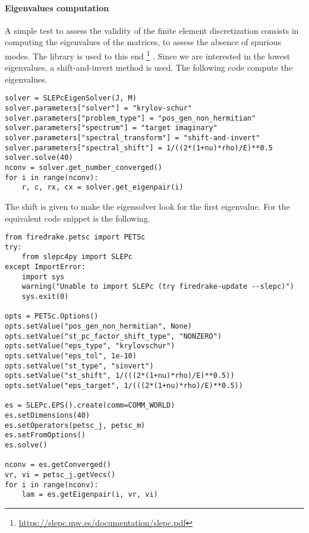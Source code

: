 \paragraph{Eigenvalues computation}
A simple test to assess the validity of the finite element discretization consists in computing the eigenvalues of the matrices, to assess the absence of spurious modes. The {} library is used to this end \footnote{\url{https://slepc.upv.es/documentation/slepc.pdf}} \cite{hernandez2005slepc}. Since we are interested in the lowest eigenvalues, a shift-and-invert method is used. The following code compute the eigenvalues.
\begin{tcolorbox}[title = Eigenvalues computation in  \fenics, coltitle=black, breakable, size=fbox, boxrule=1pt, pad at break*=1mm, colframe=red, enlarge top by=0.25em, enlarge bottom by=0.5em]
\begin{Verbatim}[tabsize=4]
solver = SLEPcEigenSolver(J, M)
solver.parameters["solver"] = "krylov-schur"
solver.parameters["problem_type"] = "pos_gen_non_hermitian"
solver.parameters["spectrum"] = "target imaginary"
solver.parameters["spectral_transform"] = "shift-and-invert"
solver.parameters["spectral_shift"] = 1/((2*(1+nu)*rho)/E)**0.5
solver.solve(40)
nconv = solver.get_number_converged()
for i in range(nconv):
	r, c, rx, cx = solver.get_eigenpair(i)
\end{Verbatim}
\end{tcolorbox}
The shift is given to make the eigensolver look for the first eigenvalue. For \firedrake the equivalent code snippet is the following.
\begin{tcolorbox}[title = Eigenvalues computation in  \firedrake, coltitle=black, breakable, size=fbox, boxrule=1pt, pad at break*=1mm, colframe=cyan, enlarge top by=0.25em, enlarge bottom by=0.5em]
\begin{Verbatim}[tabsize=4]
from firedrake.petsc import PETSc
try:
	from slepc4py import SLEPc
except ImportError:
	import sys
	warning("Unable to import SLEPc (try firedrake-update --slepc)")
	sys.exit(0)

opts = PETSc.Options()
opts.setValue("pos_gen_non_hermitian", None)
opts.setValue("st_pc_factor_shift_type", "NONZERO")
opts.setValue("eps_type", "krylovschur")
opts.setValue("eps_tol", 1e-10)
opts.setValue("st_type", "sinvert")
opts.setValue("st_shift", 1/(((2*(1+nu)*rho)/E)**0.5))
opts.setValue("eps_target", 1/(((2*(1+nu)*rho)/E)**0.5))

es = SLEPc.EPS().create(comm=COMM_WORLD)
es.setDimensions(40)
es.setOperators(petsc_j, petsc_m)
es.setFromOptions()
es.solve()

nconv = es.getConverged()
vr, vi = petsc_j.getVecs()
for i in range(nconv):
	lam = es.getEigenpair(i, vr, vi)
\end{Verbatim}
\end{tcolorbox}



